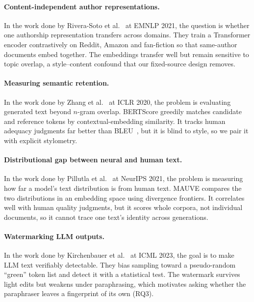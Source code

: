 \paragraph{Content-independent author representations.}
In the work done by Rivera-Soto et al.~\cite{riverasoto2021learning} at EMNLP 2021, the question is
whether one authorship representation transfers across domains. They train a Transformer encoder
contrastively on Reddit, Amazon and fan-fiction so that same-author documents embed together. The
embeddings transfer well but remain sensitive to topic overlap, a style--content confound that our
fixed-source design removes.

\paragraph{Measuring semantic retention.}
In the work done by Zhang et al.~\cite{zhang2020bertscore} at ICLR 2020, the problem is evaluating
generated text beyond $n$-gram overlap. BERTScore greedily matches candidate and reference tokens
by contextual-embedding similarity. It tracks human adequacy judgments far better than
BLEU~\cite{papineni2002bleu}, but it is blind to style, so we pair it with explicit stylometry.

\paragraph{Distributional gap between neural and human text.}
In the work done by Pillutla et al.~\cite{pillutla2021mauve} at NeurIPS 2021, the problem is
measuring how far a model's text distribution is from human text. MAUVE compares the two
distributions in an embedding space using divergence frontiers. It correlates well with human
quality judgments, but it scores whole corpora, not individual documents, so it cannot trace one
text's identity across generations.

\paragraph{Watermarking LLM outputs.}
In the work done by Kirchenbauer et al.~\cite{kirchenbauer2023watermark} at ICML 2023, the goal is
to make LLM text verifiably detectable. They bias sampling toward a pseudo-random ``green'' token
list and detect it with a statistical test. The watermark survives light edits but weakens under
paraphrasing, which motivates asking whether the paraphraser leaves a fingerprint of its own (RQ3).

